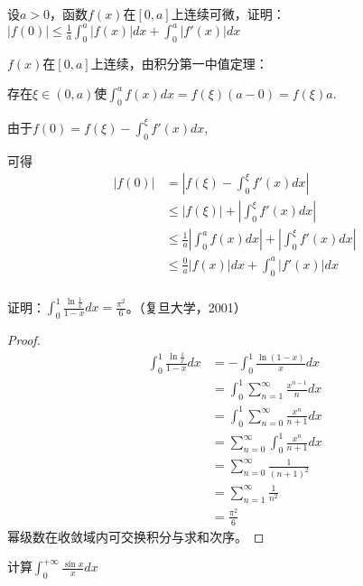 \begin{example}
    设$a>0$，函数$f(x)$在$[0,a]$上连续可微，证明：$|f(0)|\leq\frac1a\int_0^a|f(x)|dx+\int_0^a|f'(x)|dx$
    
    
    $f(x)$在$[0,a]$上连续，由积分第一中值定理：
  
  存在$\xi\in(0,a)$使$\int_0^af(x)dx=f(\xi)(a-0)=f(\xi)a.$
  
  由于$f(0)=f(\xi)-\int_0^{\xi}f'(x)dx$,
  
  可得
  \begin{align*}
  |f(0)|&=|f(\xi)-\int_0^{\xi}f'(x)dx|\\
  &\leq|f(\xi)|+|\int_0^{\xi}f'(x)dx|\\
  &\leq\frac{1}{a}|\int_0^af(x)dx|+|\int_0^{\xi}f'(x)dx|\\
  &\leq\frac{0}{a}|f(x)|dx+\int_0^a|f'(x)|dx\\
  \end{align*}
\end{example}
  
\begin{example}
证明：$\int_0^1\frac{\ln\frac1x}{1-x}dx=\frac{\pi^2}6$。（复旦大学，2001）
\end{example}

\begin{proof}
  \begin{align*}
    \int_0^1\frac{\ln\frac1x}{1-x}dx&=-\int_0^1\frac{\ln(1-x)}{x}dx\\
    &=\int_0^1\sum_{n=1}^{\infty}\frac{x^{n-1}}{n}dx\\
    &=\int_0^1\sum_{n=0}^{\infty}\frac{x^n}{n+1}dx\\
    &=\sum_{n=0}^{\infty}\int_0^1\frac{x^n}{n+1}dx\\
    &=\sum_{n=0}^{\infty}\frac{1}{(n+1)^2}\\
    &=\sum_{n=1}^{\infty}\frac{1}{n^2}\\  
    &=\frac{\pi^2}6
    \end{align*}
    幂级数在收敛域内可交换积分与求和次序。
\end{proof}

\begin{example}
计算$\int_0^{+\infty}\frac{\sin x}xdx$ %
\end{example}

